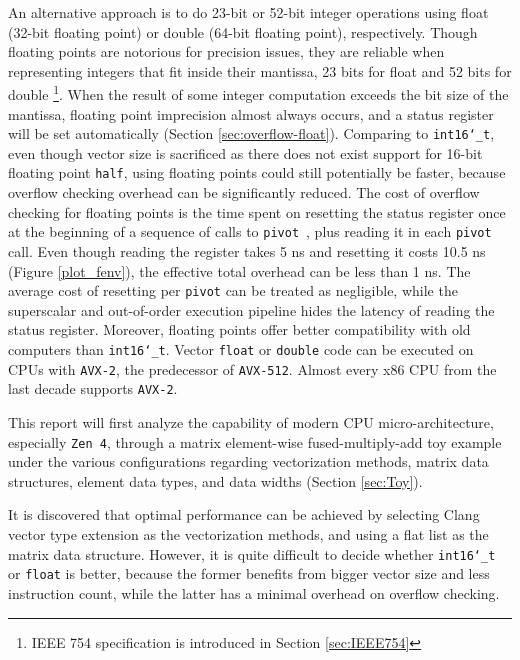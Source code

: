 \documentclass[logo,bsc,singlespacing,parskip]{infthesis}
\newcommand{\dtshort}{\texttt{int16\char`_t}}
\newcommand{\dtfloat}{\texttt{float}}
\newcommand{\dtdouble}{\texttt{double}}
\newcommand{\pivot}{\texttt{pivot}}
\begin{document}
An alternative approach is to do 23-bit or 52-bit integer operations using float
(32-bit floating point) or double (64-bit floating point), respectively. Though
floating points are notorious for precision issues, they are reliable when
representing integers that fit inside their mantissa, 23 bits for float and 52
bits for double \footnote{ IEEE 754 specification is introduced in Section
\ref{sec:IEEE754}}. When the result of some integer computation exceeds the bit
size of the mantissa, floating point imprecision almost always occurs, and a
status register will be set automatically (Section \ref{sec:overflow-float}).
Comparing to \dtshort{}, even though vector size is sacrificed as there does not
exist support for 16-bit floating point \texttt{half}, using floating points
could still potentially be faster, because overflow checking overhead can be
significantly reduced. The cost of overflow checking for floating points is the
time spent on resetting the status register once at the beginning of a sequence
of calls to \pivot{}~\cite{FPL1}, plus reading it in each \pivot{} call. Even
though reading the register takes 5 ns and resetting it costs 10.5 ns (Figure
\ref{plot_fenv}), the effective total overhead can be less than 1 ns. The
average cost of resetting per \pivot{} can be treated as negligible, while the
superscalar and out-of-order execution pipeline hides the latency of reading the
status register. Moreover, floating points offer better compatibility with old
computers than \dtshort{}. Vector \dtfloat{} or \dtdouble{} code can be executed
on CPUs with \texttt{AVX-2}, the predecessor of \texttt{AVX-512}. Almost every
x86 CPU from the last decade supports \texttt{AVX-2}. 

This report will first analyze the capability of modern CPU micro-architecture,
especially \texttt{Zen 4}, through a matrix element-wise fused-multiply-add toy
example under the various configurations regarding vectorization methods, matrix
data structures, element data types, and data widths (Section \ref{sec:Toy}). 

It is discovered that optimal performance can be achieved by selecting Clang
vector type extension as the vectorization methods, and using a flat list as the
matrix data structure. However, it is quite difficult to decide whether
\dtshort{} or \dtfloat{} is better, because the former benefits from bigger
vector size and less instruction count, while the latter has a minimal overhead
on overflow checking. 
\end{document}
